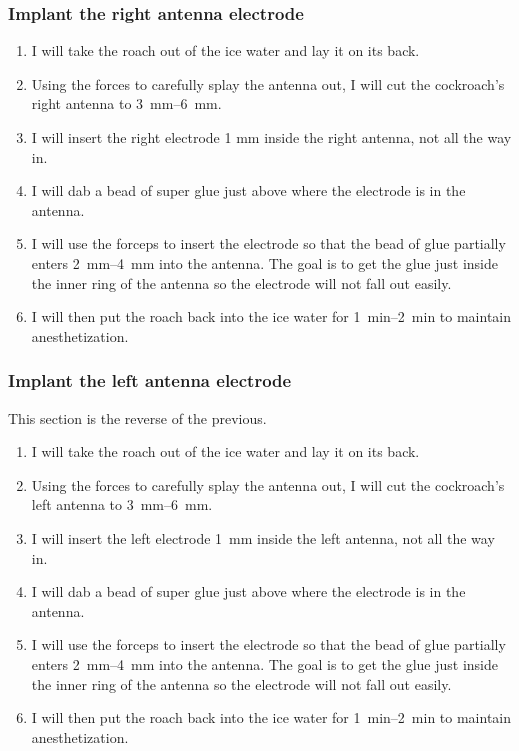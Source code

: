 \subsubsection{Implant the right antenna electrode}
\begin{enumerate}
    \item I will take the roach out of the ice water and lay it on its back.
    \item Using the forces to carefully splay the antenna out, I will cut the cockroach's right antenna to \SIrange{3}{6}{\milli\meter}.
    \item I will insert the right electrode 1 mm inside the right antenna, not all the way in.
    \item I will dab a bead of super glue just above where the electrode is in the antenna.
    \item  I will use the forceps to insert the electrode so that the bead of glue partially enters \SIrange{2}{4}{\milli\meter} into the antenna.
        \subitem The goal is to get the glue just inside the inner ring of the antenna so the electrode will not fall out easily.
    \item I will then put the roach back into the ice water for \SIrange{1}{2}{\minute} to maintain anesthetization.
\end{enumerate}

\subsubsection{Implant the left antenna electrode}
This section is the reverse of the previous. 
\begin{enumerate}
    \item I will take the roach out of the ice water and lay it on its back.
    \item Using the forces to carefully splay the antenna out, I will cut the cockroach's left antenna to \SIrange{3}{6}{\milli\meter}.
    \item I will insert the left electrode \SI{1}{\milli\meter} inside the left antenna, not all the way in.
    \item I will dab a bead of super glue just above where the electrode is in the antenna.
    \item I will use the forceps to insert the electrode so that the bead of glue partially enters \SIrange{2}{4}{\milli\meter} into the antenna.
        \subitem The goal is to get the glue just inside the inner ring of the antenna so the electrode will not fall out easily.
    \item I will then put the roach back into the ice water for \SIrange{1}{2}{\minute} to maintain anesthetization.
\end{enumerate}
      
